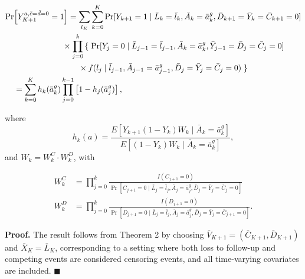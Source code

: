 \begin{tcolorbox}[title=Corollary 4: Equivalence of g-formula and IPW representation for direct effect]

\begin{align*}
\Pr& \Bigl[Y^{a,\bar{c} = \bar{d} = 0}_{K+1}=1\Bigr] 
= \sum_{l_K} \sum_{k=0}^K \Pr[Y_{k+1} = 1 \mid \bar{L}_k = \bar{l}_k, \bar{A}_k = \bar{a}^g_k, \bar{D}_{k+1}=\bar{Y}_k = \bar{C}_{k+1} = 0] \\
& \quad \quad \quad \quad\quad \quad \times \prod_{j=0}^{k} \left\{ \right.
\Pr[Y_j = 0 \mid \bar{L}_{j-1} = \bar{l}_{j-1}, \bar{A}_k = \bar{a}^g_k, \bar{Y}_{j-1} = \bar{D}_j = \bar{C}_j = 0] \\
& \quad \quad\quad \quad\quad \quad\quad \quad \times f(l_j \mid \bar{l}_{j-1}, \bar{A}_{j-1}=\bar{a}^g_{j-1}, \bar{D}_j = \bar{Y}_j = \bar{C}_j =0) 
\left. \right\} \\
& = \sum_{k=0}^K h_k(\bar{a}^g_k) \prod_{j=0}^{k-1} \left[1 - h_j(\bar{a}^g_j)\right],
\end{align*}

where
$$
h_k(a) = \frac{E[Y_{k+1}(1 - Y_k) W_k \mid \bar{A}_k = \bar{a}^g_k]}{E[(1 - Y_k) W_k \mid \bar{A}_k=\bar{a}^g_k]},
$$
and \(W_k = W^C_k \cdot W^D_k\), with

\begin{align*}
    W^C_k &= \prod_{j=0}^k \frac{I(C_{j+1} = 0)}{\Pr[C_{j+1} = 0 \mid \bar{L}_j = \bar{l}_j, \bar{A}_j = \bar{a}^g_j,  \bar{D}_j = \bar{Y}_j = \bar{C}_j =0]} \\
    W^D_k & = \prod_{j=0}^k \frac{I(D_{j+1} = 0)}{\Pr[D_{j+1} = 0 \mid \bar{L}_j = \bar{l}_j,\bar{A}_j = \bar{a}^g_j, \bar{D}_j = \bar{Y}_j =  \bar{C}_{j+1} =0]}.
\end{align*}
\end{tcolorbox}

\textbf{Proof.} The result follows from Theorem 2 by choosing \(\bar{V}_{K+1} = (\bar{C}_{K+1}, \bar{D}_{K+1})\) and \(\bar{X}_K = \bar{L}_K\), corresponding to a setting where both loss to follow-up and competing events are considered censoring events, and all time-varying covariates are included. 
\(\blacksquare\)